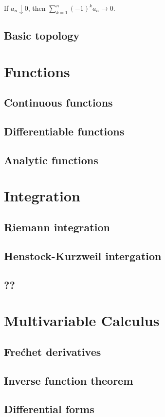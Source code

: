 \documentclass{../note}
\begin{document}
\begin{prb}
\begin{parts}
\item If $a_n\downarrow0$, then $\sum_{k=1}^n(-1)^ka_n\to0$.
\end{parts}
\end{prb}

\chapter{Basic topology}

\part{Functions}

\chapter{Continuous functions}

\chapter{Differentiable functions}

\chapter{Analytic functions}


\part{Integration}

\chapter{Riemann integration}

\chapter{Henstock-Kurzweil intergation}

\chapter{??}


\part{Multivariable Calculus}
\chapter{Fre\'chet derivatives}
\chapter{Inverse function theorem}
\chapter{Differential forms}
\end{document}
